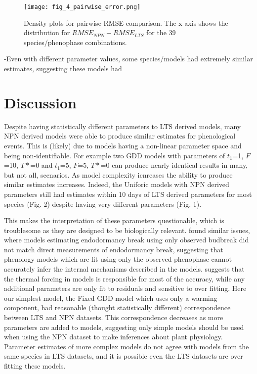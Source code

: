 \documentclass[fleqn,10pt,lineno]{wlpeerj} %
\begin{document}
\begin{figure}
	\centering
		\texttt{[image: fig\_4\_pairwise\_error.png]}
	\caption{Density plots for pairwise RMSE comparison. The x axis shows the distribution for $RMSE_{NPN} - RMSE_{LTS}$  for the  39 species/phenophase combinations.}
\end{figure}

-Even with different parameter values, some species/models had extremely similar
estimates, suggesting these models had 

\section*{Discussion}

Despite having statistically different parameters to LTS derived models, many NPN derived models were able to produce similar estimates for phenological events. This is (likely) due to models having a non-linear parameter space and being non-identifiable. For example two GDD models with parameters of $t_{1}$=1, $F$=10, $T*$=0 and $t_{1}$=5, $F$=5, $T*$=0 can produce nearly identical results in many, but not all, scenarios. As model complexity icnreases the ability to produce similar estimates increases. Indeed, the Uniforic models with NPN derived parameters still had estimates within 10 days of LTS derived parameters for most species (Fig. 2) despite having very different parameters (Fig. 1). 

This makes the interpretation of these parameters questionable, which is troublesome as they are designed to be biologically relevant. \cite{chuine2016} found similar issues, where models estimating endodormancy break using only observed budbreak did not match direct measurements of endodormancy break, suggesting that phenology models which are fit using only the observed phenophase cannot accurately infer the internal mechanisms described in the models. \cite{basler2016} suggests that the thermal forcing in models is responsible for most of the accuracy, while any additional parameters are only fit to residuals and sensitive to over fitting. Here our simplest model, the Fixed GDD model which uses only a warming component, had reasonable (thought statistically different) correspondence between LTS and NPN datasets. This correspondence decreases as more parameters are added to models, suggesting only simple models should be used when using the NPN dataset to make inferences about plant physiology. Parameter estimates of more complex models do not agree with models from the same species in LTS datasets, and it is possible even the LTS datasets are over fitting these models. 
\end{document}
